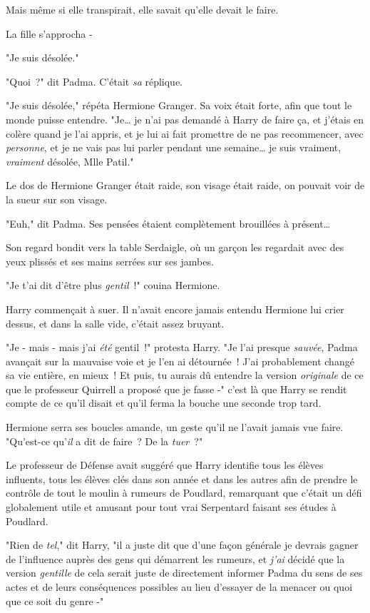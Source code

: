 Mais même si elle transpirait, elle savait qu'elle devait le faire.

La fille s'approcha -

"Je suis désolée."

"Quoi~?" dit Padma. C'était \emph{sa} réplique.

"Je suis désolée," répéta Hermione Granger. Sa voix était forte, afin que tout le monde puisse entendre. "Je… je n'ai pas demandé à Harry de faire ça, et j'étais en colère quand je l'ai appris, et je lui ai fait promettre de ne pas recommencer, avec \emph{personne}, et je ne vais pas lui parler pendant une semaine… je suis vraiment, \emph{vraiment} désolée, Mlle Patil."

Le dos de Hermione Granger était raide, son visage était raide, on pouvait voir de la sueur sur son visage.

"Euh," dit Padma. Ses pensées étaient complètement brouillées à présent…

Son regard bondit vers la table Serdaigle, où un garçon les regardait avec des yeux plissés et ses mains serrées sur ses jambes.


"Je t'ai dit d'être plus \emph{gentil}~!" couina Hermione.

Harry commençait à suer. Il n'avait encore jamais entendu Hermione lui crier dessus, et dans la salle vide, c'était assez bruyant.

"Je - mais - mais j'ai \emph{été} gentil~!" protesta Harry. "Je l'ai presque \emph{sauvée}, Padma avançait sur la mauvaise voie et je l'en ai détournée~! J'ai probablement changé sa vie entière, en mieux~! Et puis, tu aurais dû entendre la version \emph{originale} de ce que le professeur Quirrell a proposé que je fasse -" c'est là que Harry se rendit compte de ce qu'il disait et qu'il ferma la bouche une seconde trop tard.

Hermione serra ses boucles amande, un geste qu'il ne l'avait jamais vue faire. "Qu'est-ce qu'\emph{il} a dit de faire~? De la \emph{tuer}~?"

Le professeur de Défense avait suggéré que Harry identifie tous les élèves influents, tous les élèves clés dans son année et dans les autres afin de prendre le contrôle de tout le moulin à rumeurs de Poudlard, remarquant que c'était un défi globalement utile et amusant pour tout vrai Serpentard faisant ses études à Poudlard.

"Rien de \emph{tel}," dit Harry, "il a juste dit que d'une façon générale je devrais gagner de l'influence auprès des gens qui démarrent les rumeurs, et \emph{j'ai} décidé que la version \emph{gentille} de cela serait juste de directement informer Padma du sens de ses actes et de leurs conséquences possibles au lieu d'essayer de la menacer ou quoi que ce soit du genre -"

